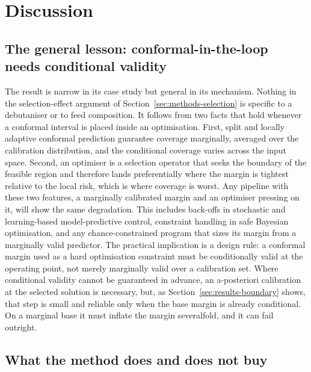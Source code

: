 \section{Discussion}
\label{sec:discussion}

\subsection{The general lesson: conformal-in-the-loop needs conditional validity}

The result is narrow in its case study but general in its mechanism. Nothing in the
selection-effect argument of Section~\ref{sec:methods-selection} is specific to a debutaniser or
to feed composition. It follows from two facts that hold whenever a conformal interval is placed
inside an optimisation. First, split and locally adaptive conformal prediction guarantee
coverage marginally, averaged over the calibration distribution, and the conditional coverage
varies across the input space. Second, an optimiser is a selection operator that seeks the
boundary of the feasible region and therefore lands preferentially where the margin is tightest
relative to the local risk, which is where coverage is worst. Any pipeline with these two
features, a marginally calibrated margin and an optimiser pressing on it, will show the same
degradation. This includes back-offs in stochastic and learning-based model-predictive control,
constraint handling in safe Bayesian optimisation, and any chance-constrained program that sizes
its margin from a marginally valid predictor. The practical implication is a design rule: a
conformal margin used as a hard optimisation constraint must be conditionally valid at the
operating point, not merely marginally valid over a calibration set. Where conditional validity
cannot be guaranteed in advance, an a-posteriori calibration at the selected solution
\citep{zhao2024cpp} is necessary, but, as Section~\ref{sec:results-boundary} shows, that step is
small and reliable only when the base margin is already conditional. On a marginal base it must
inflate the margin severalfold, and it can fail outright.

\subsection{What the method does and does not buy}

